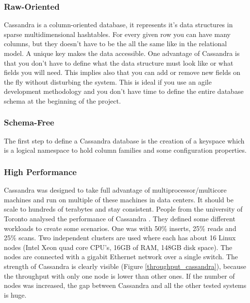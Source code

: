 \documentclass[a4paper]{article}
\begin{document}
\subsubsection{Raw-Oriented}
Cassandra is a column-oriented database, it represents it's data structures in sparse multidimensional hashtables. For every given row you can have many columns, but they doesn't have to be the all the same like in the relational model. A unique key makes the data accessible. One advantage of Cassandra is that you don't have to define what the data structure must look like or what fields you will need. This implies also that you can add or remove new fields on the fly without disturbing the system. This is ideal if you use an agile development methodology and you don't have time to define the entire database schema at the beginning of the project.

\subsubsection{Schema-Free}
The first step to define a Cassandra database is the creation of a keyspace which is a logical namespace to hold column families and some configuration properties.

\subsubsection{High Performance}
Cassandra was designed to take full advantage of multiprocessor/multicore machines and run on multiple of these machines in data centers. It should be scale to hundreds of terabytes and stay consistent. People from the university of Toronto analysed the performance of Cassandra \cite{perfCassandra}. They defined some different workloads to create some scenarios. One was with 50\% inserts, 25\% reads and 25\% scans. Two independent clusters are used where each has about 16 Linux nodes (Intel Xeon quad core CPU's, 16GB of RAM, 148GB disk space). The nodes are connected with a gigabit Ethernet network over a single switch. The strength of Cassandra is clearly visible (Figure \ref{throughput_cassandra}), because the throughput with only one node is lower than other ones. If the number of nodes was increased, the gap between Cassandra and all the other tested systems is huge.
\end{document}
